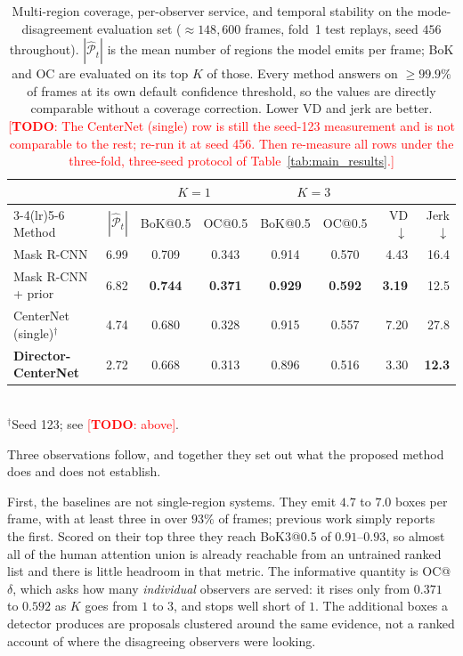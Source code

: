 \documentclass[preprint,12pt]{elsarticle}
\newcommand{\todo}[1]{\textcolor{red}{[\textbf{TODO}: #1]}}
\begin{document}
\begin{table}[t]
  \centering
  \caption{Multi-region coverage, per-observer service, and temporal stability
  on the mode-disagreement evaluation set ($\approx 148{,}600$ frames, fold~1
  test replays, seed $456$ throughout). $|\hat{\mathcal{P}}_t|$ is the mean
  number of regions the model emits per frame; BoK and OC are evaluated on its
  top $K$ of those. Every method answers on $\ge 99.9\%$ of frames at its own
  default confidence threshold, so the values are directly comparable without a
  coverage correction. Lower VD and jerk are better. \todo{The CenterNet
  (single) row is still the seed-123 measurement and is not comparable to the
  rest; re-run it at seed 456. Then re-measure all rows under the three-fold,
  three-seed protocol of Table~\ref{tab:main_results}.}}
  \label{tab:multi_results}
  \begin{tabular}{lrccccrr}
    \toprule
    & & \multicolumn{2}{c}{$K=1$} & \multicolumn{2}{c}{$K=3$} & & \\
    \cmidrule(lr){3-4}\cmidrule(lr){5-6}
    Method & $|\hat{\mathcal{P}}_t|$ & BoK@0.5 & OC@0.5 & BoK@0.5 & OC@0.5
           & VD $\downarrow$ & Jerk $\downarrow$ \\
    \midrule
    Mask R-CNN            & 6.99 & 0.709 & 0.343 & 0.914 & 0.570 & 4.43 & 16.4 \\
    Mask R-CNN + prior    & 6.82 & \textbf{0.744} & \textbf{0.371}
                          & \textbf{0.929} & \textbf{0.592}
                          & \textbf{3.19} & 12.5 \\
    CenterNet (single)$^{\dagger}$ & 4.74 & 0.680 & 0.328 & 0.915 & 0.557
                          & 7.20 & 27.8 \\
    \midrule
    \textbf{Director-CenterNet} & 2.72 & 0.668 & 0.313 & 0.896 & 0.516
                          & 3.30 & \textbf{12.3} \\
    \bottomrule
  \end{tabular}
  \\[2pt]
  \footnotesize $^{\dagger}$Seed 123; see \todo{above}.
\end{table}

Three observations follow, and together they set out what the proposed method
does and does not establish.

First, the baselines are not single-region systems. They emit $4.7$ to $7.0$
boxes per frame, with at least three in over $93\%$ of frames; previous work
simply reports the first. Scored on their top three they reach BoK3@0.5 of
$0.91$--$0.93$, so almost all of the human attention union is already reachable
from an untrained ranked list and there is little headroom in that metric. The
informative quantity is OC@$\delta$, which asks how many \emph{individual}
observers are served: it rises only from $0.371$ to $0.592$ as $K$ goes from
$1$ to $3$, and stops well short of $1$. The additional boxes a detector
produces are proposals clustered around the same evidence, not a ranked account
of where the disagreeing observers were looking.
\end{document}

